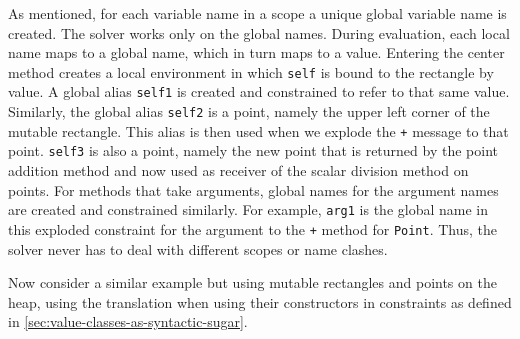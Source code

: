 \documentclass{article}
\begin{document}
As mentioned, for each variable name in a scope a unique global
variable name is created.  The solver works only on the global
names. During evaluation, each local name maps to a global name, which
in turn maps to a value. Entering the center method creates a local
environment in which \verb|self| is bound to the rectangle by value.
A global alias \verb|self1| is created and constrained to refer to
that same value.  Similarly, the global alias \verb|self2| is a point,
namely the upper left corner of the mutable rectangle.  This alias is
then used when we explode the \verb|+| message to that point.
\verb|self3| is also a point, namely the new point that is returned by
the point addition method and now used as receiver of the scalar
division method on points.  For methods that take arguments, global
names for the argument names are created and constrained similarly.
For example, \verb|arg1| is the global name in this exploded
constraint for the argument to the \verb|+| method for
\verb|Point|. Thus, the solver never has to deal with different scopes
or name clashes.

Now consider a similar example but using mutable rectangles and points
on the heap, using the translation when using their constructors in
constraints as defined in
\autoref{sec:value-classes-as-syntactic-sugar}.
\end{document}
